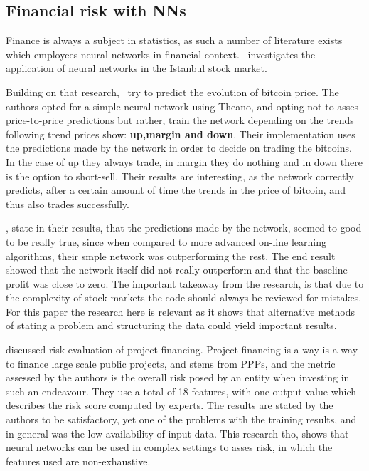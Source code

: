 \documentclass[12pt]{article}
\begin{document}
\subsection{Financial risk with NNs}
\label{sub:financial_risk_nn}
Finance is always a subject in statistics, as such a number of literature exists which employees neural networks in financial context.~\cite{instanbulStock} investigates the application of neural networks in the Istanbul stock market. 

Building on that research,~\cite{bitcoinNN} try to predict the evolution of bitcoin price. The authors opted for a simple neural network using Theano, and opting not to asses price-to-price predictions but rather, train the network depending on the trends following trend prices show: \textbf{up,margin and down}. Their implementation uses the predictions made by the network in order to decide on trading the bitcoins. In the case of up they always trade, in margin they do nothing and in down there is the option to short-sell. Their results are interesting, as the network correctly predicts, after a certain amount of time the trends in the price of bitcoin, and thus also trades successfully.

\cite{bitoinNN}, state in their results, that the predictions made by the network, seemed to good to be really true, since when compared to more advanced on-line learning algorithms, their smple network was outperforming the rest. The end result showed that the network itself did not really outperform and that the baseline profit was close to zero. The important takeaway from the research, is that due to the complexity of stock markets the code should always be reviewed for mistakes. For this paper the research here is relevant as it shows that alternative methods of stating a problem and structuring the data could yield important results.

\cite{04443437.pdf} discussed risk evaluation of project financing. Project financing is a way is a way to finance large scale public projects, and stems from PPPs, and the metric assessed by the authors is the overall risk posed by an entity when investing in such an endeavour. They use a total of 18 features, with one output value which describes the risk score computed by experts. The results are stated by the authors to be satisfactory, yet one of the problems with the training results, and in general was the low availability of input data. This research tho, shows that neural networks can be used in complex settings to asses risk, in which the features used are non-exhaustive.
\end{document}
